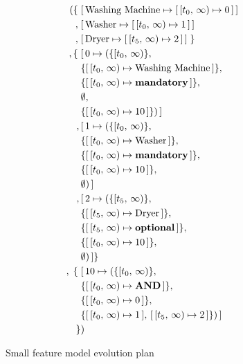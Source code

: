 \begin{figure}
  \begin{align*}
    ( \{ \; & [\,\text{Washing Machine} \mapsto [\,[t_0,\, \infty) \mapsto 0\,]\,] \\
       ,\; & [\,\text{Washer} \mapsto [\,[t_0,\, \infty) \mapsto 1\,]\,] \\
       ,\; & [\,\text{Dryer} \mapsto [\,[t_5,\, \infty) \mapsto 2\,]\,]\; \} \\
       ,\{\; & [\,0 \mapsto (\{[t_0,\, \infty)\} ,\, \\
             & \{[\,[t_0,\, \infty) \mapsto \text{Washing Machine}\,]\} ,\, \\
             & \{[\,[t_0,\, \infty) \mapsto \textbf{mandatory}\,]\} ,\, \\
             &  \emptyset ,\, \\ 
             & \{[\,[t_0,\, \infty) \mapsto 10\,]\})\,] \\
             ,\, & [\,1 \mapsto (\{[t_0,\, \infty)\} ,\, \\
             & \{[\,[t_0,\, \infty) \mapsto \text{Washer}\,]\} ,\, \\
             & \{[\,[t_0,\, \infty) \mapsto \textbf{mandatory}\,]\} ,\, \\
             &  \{[\,[t_0,\, \infty) \mapsto 10\,]\} ,\, \\ 
             & \emptyset)\,] \\
             ,\, & [\,2 \mapsto (\{[t_5,\, \infty)\} ,\, \\
             & \{[\,[t_5,\, \infty) \mapsto \text{Dryer}\,]\} ,\, \\
             & \{[\,[t_5,\, \infty) \mapsto \textbf{optional}\,]\} ,\, \\
             &  \{[\,[t_0,\, \infty) \mapsto 10\,]\} ,\, \\ 
             & \emptyset)\,] \}\\
    ,\; \{ \; & [\,10 \mapsto (\{[t_0,\, \infty)\} ,\, \\
              & \{[\,[t_0,\, \infty) \mapsto \textbf{AND}\,]\} ,\, \\
              & \{[\,[t_0,\, \infty) \mapsto 0\,]\} ,\, \\
              & \{[\,[t_0,\, \infty) \mapsto 1\,],\, [\,[t_5,\, \infty) \mapsto 2\,]\} )\,]\\
    \}&)\\
  \end{align*}
  \caption{Small feature model evolution plan}
  \label{ex:washing-machine}
\end{figure}


